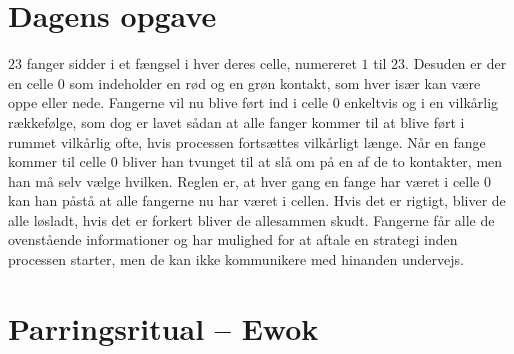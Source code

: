 \begin{minipage}[t]{100mm}
\vspace{3mm}
\section*{Dagens opgave}
$23$ fanger sidder i et fængsel i hver deres celle, numereret $1$ til $23$. Desuden er der en celle $0$ som indeholder en rød og en grøn kontakt, som hver især kan være oppe eller nede. Fangerne vil nu blive ført ind i celle $0$ enkeltvis og i en vilkårlig rækkefølge, som dog er lavet sådan at alle fanger kommer til at blive ført i rummet vilkårlig ofte, hvis processen fortsættes vilkårligt længe. Når en fange kommer til celle $0$ bliver han tvunget til at slå om på en af de to kontakter, men han må selv vælge hvilken. Reglen er, at hver gang en fange har været i celle $0$ kan han påstå at alle fangerne nu har været i cellen. Hvis det er rigtigt, bliver de alle løsladt, hvis det er forkert bliver de allesammen skudt. Fangerne får alle de ovenstående informationer og har mulighed for at aftale en strategi inden processen starter, men de kan ikke kommunikere med hinanden undervejs.

\section*{Parringsritual -- Ewok}

\end{minipage}

